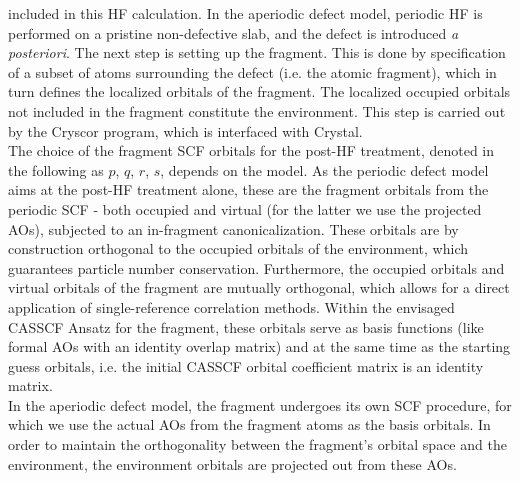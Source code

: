 \documentclass[a4paper,11pt,headings=normal]{scrartcl}
\begin{document}
\begin{itemize}
included in this HF calculation. In the aperiodic defect model, periodic HF is 
performed on a pristine non-defective slab, and the defect is introduced 
\textit{a posteriori}.
The next step is setting up the fragment. This is done by specification of a 
subset of atoms surrounding the defect (i.e. the atomic fragment), which in turn defines the localized orbitals of the fragment.
The localized occupied orbitals not included in the fragment 
constitute the environment. This step is carried out by the 
Cryscor program,\autocite{usvyat18} which is interfaced with Crystal.\\
The choice of the fragment SCF orbitals for the post-HF treatment, denoted in the following as $p$, 
$q$, $r$, $s$, depends on the model. As the periodic 
defect model aims at the post-HF treatment alone,
these are the fragment orbitals from the periodic SCF - both occupied and virtual (for the latter we use the projected AOs), subjected to an in-fragment canonicalization. These orbitals are by construction 
orthogonal to the occupied orbitals of the environment,
which guarantees 
particle number conservation. Furthermore, the occupied orbitals and virtual 
orbitals of the fragment are mutually orthogonal, which allows for a direct 
application of single-reference correlation methods. Within the envisaged 
CASSCF Ansatz for the fragment, these orbitals serve as basis functions (like 
formal AOs with an identity overlap matrix) and at the same time as the 
starting guess orbitals, i.e. the initial CASSCF orbital coefficient matrix is 
an identity matrix.\\
In the aperiodic defect model,
the fragment undergoes its own SCF procedure, for which we use the actual 
AOs from the fragment atoms as the basis orbitals. In order to maintain the 
orthogonality between the fragment's orbital space and the environment, 
the environment orbitals are projected out from these AOs.\\

\end{itemize}
\end{document}
